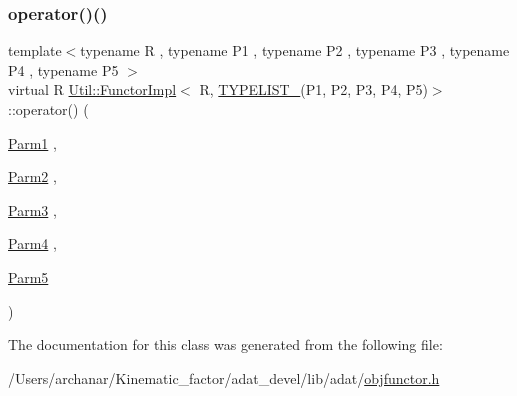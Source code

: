 \subsubsection{\texorpdfstring{operator()()}{operator()()}\hspace{0.1cm}{\footnotesize\ttfamily [2/2]}}
{\footnotesize\ttfamily template$<$typename R , typename P1 , typename P2 , typename P3 , typename P4 , typename P5 $>$ \\
virtual R \mbox{\hyperlink{classUtil_1_1FunctorImpl}{Util\+::\+Functor\+Impl}}$<$ R, \mbox{\hyperlink{install_2include_2adat_2typelist_8h_aad5d9b3c82c8503c85c625acd41c0a2f}{T\+Y\+P\+E\+L\+I\+S\+T\+\_}}(P1, P2, P3, P4, P5)$>$\+::operator() (\begin{DoxyParamCaption}\item[{\mbox{\hyperlink{structUtil_1_1Private_1_1FunctorImplBase_a9d61e693d6c616dea5bd9d9073c7d21a}{Parm1}}}]{,  }\item[{\mbox{\hyperlink{structUtil_1_1Private_1_1FunctorImplBase_a554085cd798ef14838a59b528f0feb2e}{Parm2}}}]{,  }\item[{\mbox{\hyperlink{structUtil_1_1Private_1_1FunctorImplBase_a052148e627fd4caecbcffdbdf1033dbb}{Parm3}}}]{,  }\item[{\mbox{\hyperlink{structUtil_1_1Private_1_1FunctorImplBase_a1ad7fe3f243480c44a610927ebe76762}{Parm4}}}]{,  }\item[{\mbox{\hyperlink{structUtil_1_1Private_1_1FunctorImplBase_ac5b1d132e854e4f9fd6fb1e43313fa26}{Parm5}}}]{ }\end{DoxyParamCaption})\hspace{0.3cm}{\ttfamily [pure virtual]}}



The documentation for this class was generated from the following file\+:\begin{DoxyCompactItemize}
\item 
/\+Users/archanar/\+Kinematic\+\_\+factor/adat\+\_\+devel/lib/adat/\mbox{\hyperlink{lib_2adat_2objfunctor_8h}{objfunctor.\+h}}\end{DoxyCompactItemize}

